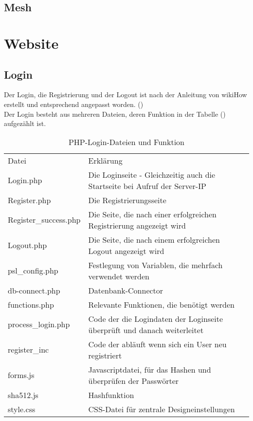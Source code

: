 \subsection{Mesh}

\section{Website}

\subsection{Login}

Der Login, die Registrierung und der Logout ist nach der Anleitung von
wikiHow erstellt und entsprechend angepasst worden. (\cite{PHP-Login})
\\
Der Login besteht aus mehreren Dateien, deren Funktion in der Tabelle
() aufgezählt ist.

\begin{table}
\caption{PHP-Login-Dateien und Funktion}
\label{tab:Login-Dateien}
\begin{tabular}{p{} p{}}
Datei & Erklärung \\
Login.php & Die Loginseite - Gleichzeitig auch die Startseite bei Aufruf der
Server-IP\\
Register.php & Die Registrierungsseite \\
Register\_success.php & Die Seite, die nach einer erfolgreichen Registrierung
angezeigt wird \\
Logout.php & Die Seite, die nach einem erfolgreichen Logout angezeigt wird \\
psl\_config.php & Festlegung von Variablen, die mehrfach verwendet werden \\
db-connect.php & Datenbank-Connector \\
functions.php & Relevante Funktionen, die benötigt werden \\
process\_login.php & Code der die Logindaten der Loginseite überprüft und danach
weiterleitet \\
register\_inc & Code der abläuft wenn sich ein User neu registriert \\
forms.js & Javascriptdatei, für das Hashen und überprüfen der Passwörter \\
sha512.js & Hashfunktion \\
style.css & CSS-Datei für zentrale Designeinstellungen \\
 \end{tabular}
\end{table}

